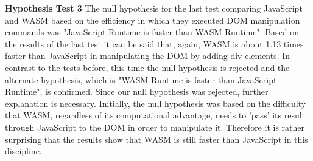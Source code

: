 \textbf{Hypothesis Test 3} \newline
The null hypothesis for the last test comparing JavaScript and WASM based on the efficiency in which they executed DOM manipulation commands was "JavaScript Runtime is faster than WASM Runtime". Based on the results of the last test it can be said that, again, WASM is about 1.13 times faster than JavaScript in manipulating the DOM by adding div elements. In contrast to the tests before, this time the null hypothesis is rejected and the alternate hypothesis, which is "WASM Runtime is faster than JavaScript Runtime", is confirmed. Since our null hypothesis was rejected, further explanation is necessary. Initially, the null hypothesis was based on the difficulty that WASM, regardless of its computational advantage, needs to 'pass' its result through JavaScript to the DOM in order to manipulate it. Therefore it is rather surprising that the results show that WASM is still faster than JavaScript in this discipline.